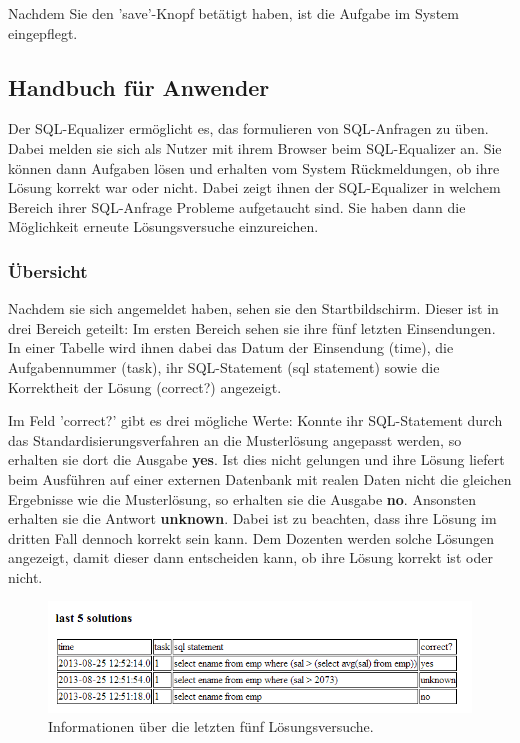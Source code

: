 \documentclass[12pt]{scrreprt}
\theoremstyle{remark}
\begin{document}
Nachdem Sie den 'save'-Knopf betätigt haben, ist die Aufgabe im System eingepflegt.


\subsection{Handbuch für Anwender}

Der SQL-Equalizer ermöglicht es, das formulieren von SQL-Anfragen zu üben. Dabei melden sie sich als Nutzer mit ihrem Browser beim SQL-Equalizer an. Sie können dann Aufgaben lösen und erhalten vom System Rückmeldungen, ob ihre Lösung korrekt war oder nicht. Dabei zeigt ihnen der SQL-Equalizer in welchem Bereich ihrer SQL-Anfrage Probleme aufgetaucht sind. Sie haben dann die Möglichkeit erneute Lösungsversuche einzureichen. 

\subsubsection{Übersicht}

Nachdem sie sich angemeldet haben, sehen sie den Startbildschirm. Dieser ist in drei Bereich geteilt: Im ersten Bereich sehen sie ihre fünf letzten Einsendungen. In einer Tabelle wird ihnen dabei das Datum der Einsendung (time), die Aufgabennummer (task), ihr SQL-Statement (sql statement) sowie die Korrektheit der Lösung (correct?) angezeigt.

Im Feld 'correct?' gibt es drei mögliche Werte: Konnte ihr SQL-Statement durch das Standardisierungsverfahren an die Musterlösung angepasst werden, so erhalten sie dort die Ausgabe \textbf{yes}. Ist dies nicht gelungen und ihre Lösung liefert beim Ausführen auf einer externen Datenbank mit realen Daten nicht die gleichen Ergebnisse wie die Musterlösung, so erhalten sie die Ausgabe \textbf{no}. Ansonsten erhalten sie die Antwort \textbf{unknown}. Dabei ist zu beachten, dass ihre Lösung im dritten Fall dennoch korrekt sein kann. Dem Dozenten werden solche Lösungen angezeigt, damit dieser dann entscheiden kann, ob ihre Lösung korrekt ist oder nicht.

\begin{figure}[H]
\centering
\includegraphics[scale=0.7]{Bilder/screen_user_1.png}
\caption{Informationen über die letzten fünf Lösungsversuche.}
\end{figure}
\end{document}
